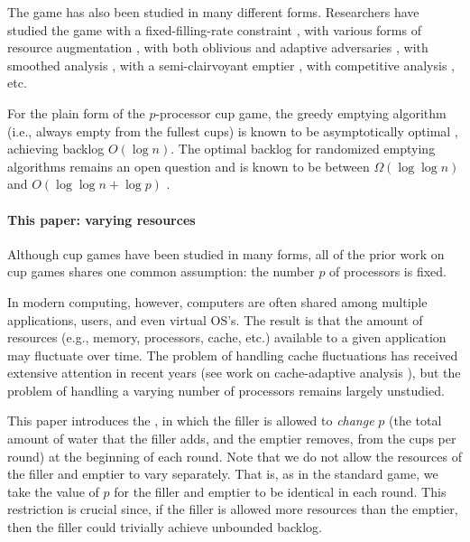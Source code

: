 The game has also been studied in many different forms. Researchers have studied the game with a fixed-filling-rate constraint \cite{BaruahCoPl96,GkasieniecKl17,BaruahGe95,LitmanMo11,LitmanMo05,MoirRa99,BarNi02,GuanYi12,Liu69, LiuLa73}, with various forms of resource augmentation \cite{BenderFaKu19, Kuszmaul20, LitmanMo09, DietzRa91}, with both oblivious and adaptive adversaries \cite{AdlerBeFr03,BaruahCoPl96,Liu69,BenderFaKu19, Kuszmaul20}, with smoothed analysis \cite{Kuszmaul20, BenderFaKu19}, with a semi-clairvoyant emptier \cite{LitmanMo09}, with competitive analysis \cite{Bar-NoyFrLa02, FleischerKo04, DamaschkeZh05}, etc.

For the plain form of the $p$-processor cup game, the greedy emptying algorithm (i.e., always empty from the fullest cups) is known to be asymptotically optimal \cite{AdlerBeFr03, BenderFaKu19, Kuszmaul20}, achieving backlog $O(\log n)$. The optimal backlog for randomized emptying algorithms remains an open question \cite{DietzRa91, BenderFaKu19, Kuszmaul20} and is known to be between $\Omega(\log \log n)$ and $O(\log \log n + \log p)$ \cite{Kuszmaul20}.

\paragraph{This paper: varying resources}
Although cup games have been studied in many forms, all of the prior work on cup games shares one common assumption: the number $p$ of processors is fixed.

In modern computing, however, computers are often shared among multiple applications, users, and even virtual OS's. The result is that the amount of resources (e.g., memory, processors, cache, etc.) available to a given application may fluctuate over time. The problem of handling cache fluctuations has received extensive attention in recent years (see work on cache-adaptive analysis \cite{CA1, CA2, CA3, CA4, CA5}), but the problem of handling a varying number of processors remains largely unstudied.

This paper introduces the , in which the filler is allowed to \emph{change} $p$ (the total amount of water that the filler adds, and the emptier removes, from the cups per round) at the beginning of each round. Note that we do not allow the resources of the filler and emptier to vary separately. That is, as in the standard game, we take the value of $p$ for the filler and emptier to be identical in each round. This restriction is crucial since, if the filler is allowed more resources than the emptier, then the filler could trivially achieve unbounded backlog.

